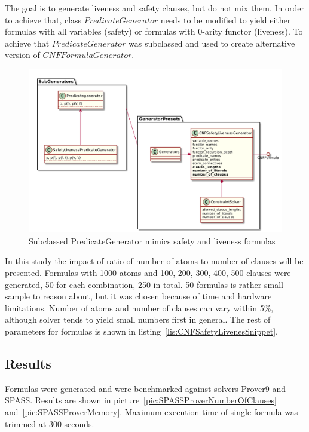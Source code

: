 The goal is to generate liveness and safety clauses, but do not mix them. In order to achieve that, class $PredicateGenerator$ needs to be modified to yield either formulas with all variables (safety) or formulas with 0-arity functor (liveness). To achieve that $PredicateGenerator$ was subclassed and used to create alternative version of $CNFFormulaGenerator$.

\begin{figure}[H]
\begin{centering}
  \includegraphics[width=\textwidth]{logic-formula-generator/fol/safety_liveness_predicate_generator.png}
  \caption{Subclassed PredicateGenerator mimics safety and liveness formulas}
\end{centering}
\end{figure}

In this study the impact of ratio of number of atoms to number of clauses will be presented.
Formulas with 1000 atoms and 100, 200, 300, 400, 500 clauses were generated, 50 for each combination, 250 in total. 50 formulas is rather small sample to reason about, but it was chosen because of time and hardware limitations. Number of atoms and number of clauses can vary within 5\%, although solver tends to yield small numbers first in general. The rest of parameters for formulas is shown in listing~\ref{lis:CNFSafetyLivenesSnippet}.

\subsection{Results}

Formulas were generated and were benchmarked against solvers Prover9 and SPASS. Results are shown in picture~\ref{pic:SPASSProverNumberOfClauses} and~\ref{pic:SPASSProverMemory}. Maximum execution time of single formula was trimmed at 300 seconds. 

